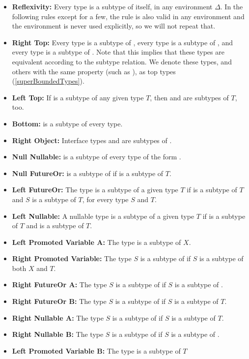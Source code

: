 \documentclass[makeidx]{article}
\begin{document}
{\def\Item#1#2{\item[#1]{\textbf{#2:}}}
\begin{itemize}
\Item{\SrnReflexivity}{Reflexivity}
  Every type is a subtype of itself, in any environment $\Delta$.
  In the following rules except for a few,
  the rule is also valid in any environment
  and the environment is never used explicitly,
  so we will not repeat that.
\Item{\SrnRightTop}{Right Top}
  Every type is a subtype of ,
  every type is a subtype of \DYNAMIC,
  and every type is a subtype of \VOID.
  Note that this implies that these types are equivalent
  according to the subtype relation.
  We denote these types,
  and others with the same property (such as ),
  as top types
  (\ref{superBoundedTypes}).
\Item{\SrnLeftTop}{Left Top}
  If  is a subtype of any given type $T$,
  then \DYNAMIC{} and \VOID{} are subtypes of $T$, too.
\Item{\SrnBottom}{Bottom}
   is a subtype of every type.
\Item{\SrnRightObjectFour}{Right Object}
  Interface types and \FUNCTION{} are subtypes of .
\Item{\SrnNullOne}{Null Nullable}
   is a subtype of every type of the form .
\Item{\SrnNullTwo}{Null FutureOr}
   is a subtype of 
  if  is a subtype of $T$.
\Item{\SrnLeftFutureOr}{Left FutureOr}
  The type  is a subtype of a given type $T$
  if  is a subtype of $T$ and $S$ is a subtype of $T$,
  for every type $S$ and $T$.
\Item{\SrnLeftNullable}{Left Nullable}
  A nullable type  is a subtype of a given type $T$
  if  is a subtype of $T$ and  is a subtype of $T$.
\Item{\SrnLeftPromotedVariableOne}{Left Promoted Variable A}
  The type  is a subtype of $X$.
\Item{\SrnRightPromotedVariable}{Right Promoted Variable}
  The type $S$ is a subtype of 
  if $S$ is a subtype of both $X$ and $T$.
\Item{\SrnRightFutureOrA}{Right FutureOr A}
  The type $S$ is a subtype of 
  if $S$ is a subtype of .
\Item{\SrnRightFutureOrB}{Right FutureOr B}
  The type $S$ is a subtype of 
  if $S$ is a subtype of $T$.
\Item{\SrnRightNullableOne}{Right Nullable A}
  The type $S$ is a subtype of 
  if $S$ is a subtype of $T$.
\Item{\SrnRightNullableTwo}{Right Nullable B}
  The type $S$ is a subtype of 
  if $S$ is a subtype of .
\Item{\SrnLeftPromotedVariableTwo}{Left Promoted Variable B}
  The type  is a subtype of $T$

\end{itemize}}
\end{document}
